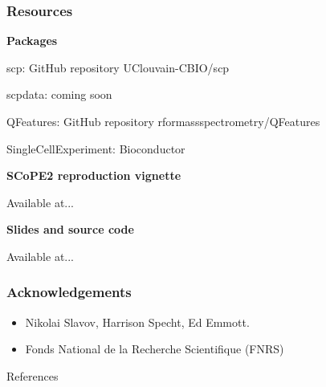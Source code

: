 \documentclass{beamer}
\newcommand{\hcode}[2][lgray]{{\ttfamily\color{vdgray}\colorbox{#1}{#2}}}
\newcommand{\frametitlesection}[1]{\frametitle{\centering #1 \footnotesize \hspace{0pt plus 1 filll} \insertsection}}
\begin{document}
\begin{frame}
    \frametitlesection{Resources}
    
    \textbf{Packages}
    
    \begin{itemize}
        \item{\hcode{scp}: GitHub repository \hcode{UClouvain-CBIO/scp}}
        \item{\hcode{scpdata}: coming soon
        \item{\hcode{QFeatures}: GitHub repository \hcode{rformassspectrometry/QFeatures}}
        \item{\hcode{SingleCellExperiment}: Bioconductor}}
    \end{itemize}
    
    \bigskip
    
    \textbf{SCoPE2 reproduction vignette}
    
    Available at...
    
    \bigskip
    
    \textbf{Slides and source code}
    
    Available at...
    
\end{frame}

\begin{frame}
    \frametitlesection{Acknowledgements}

    \begin{itemize}
    \item Nikolai Slavov, Harrison Specht, Ed Emmott.
    \item Fonds National de la Recherche Scientifique (FNRS)
    \end{itemize}
    
\end{frame}




\begin{frame}[allowframebreaks]{References}
  \scriptsize
  
  
\end{frame}
\end{document}
